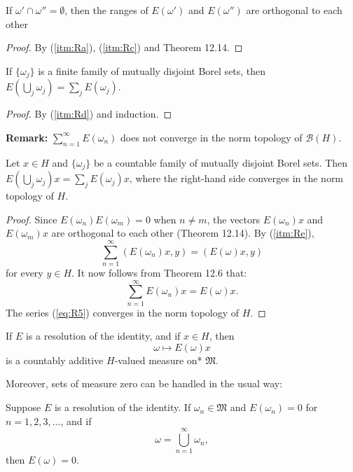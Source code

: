 \begin{lemma}
 If \( \omega' \cap \omega'' = \emptyset \),
 then the ranges of \( E(\omega') \) and \( E(\omega'') \) are orthogonal to each other
\end{lemma}
\begin{proof}
 By (\ref{itm:Ra}), (\ref{itm:Rc}) and Theorem 12.14.
\end{proof}

\begin{lemma}
 If $\{\omega_j\}$ is a finite family of mutually disjoint Borel sets, then
 $E(\bigcup_j \omega_j) = \sum_j E(\omega_j)$.
\end{lemma}
\begin{proof}
 By (\ref{itm:Rd}) and induction.
\end{proof}

\textbf{Remark:}
$\sum_{n=1}^{\infty} E(\omega_n)$ does not converge in the norm topology of $\mathcal{B}(H)$.

\begin{lemma}
 Let $x \in H$ and $\{\omega_j\}$ be a countable family of mutually disjoint Borel sets.
 Then $E(\bigcup_j \omega_j)x = \sum_j E(\omega_j)x$, where
 the right-hand side converges in the norm topology of $H$.
\end{lemma}
\begin{proof}
 Since \( E(\omega_n)E(\omega_m) = 0 \) when \( n \neq m \), the vectors \( E(\omega_n)x \) and \( E(\omega_m)x \)
 are orthogonal to each other (Theorem 12.14).
 By (\ref{itm:Re}),
 \begin{equation}
   \label{eq:R5}
   \sum_{n=1}^{\infty} (E(\omega_n)x, y) = (E(\omega)x, y)
 \end{equation}
 for every \( y \in H \).
 It now follows from Theorem 12.6 that:
 \[
  \sum_{n=1}^{\infty} E(\omega_n)x = E(\omega)x.
 \]
 The series (\eqref{eq:R5}) converges in the norm topology of \( H \).
\end{proof}

\begin{proposition}[12.18]
  If \( E \) is a resolution of the identity, and if \( x \in H \), then
  \[
    \omega \mapsto E(\omega)x
  \]
  is a countably additive \( H \)-valued measure on* \( \mathfrak{M} \).
\end{proposition}

Moreover, sets of measure zero can be handled in the usual way:

\begin{proposition}[12.19]
  Suppose \( E \) is a resolution of the identity.
  If \( \omega_n \in \mathfrak{M} \) and \( E(\omega_n) = 0 \) for \( n = 1,2,3,\dots \), and if
  \[
    \omega = \bigcup_{n=1}^{\infty} \omega_n,
  \]
  then \( E(\omega) = 0 \).
\end{proposition}

